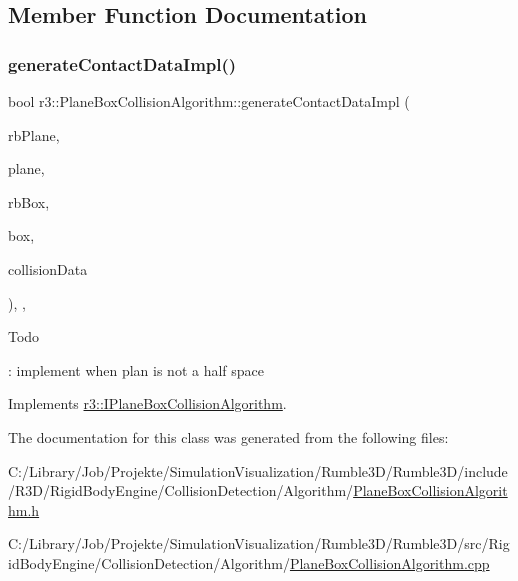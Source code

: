 \subsection{Member Function Documentation}
\mbox{\label{classr3_1_1_plane_box_collision_algorithm_a529c85973e9dab38e7427cdf9177d9ba}} 
\subsubsection{\texorpdfstring{generate\+Contact\+Data\+Impl()}{generateContactDataImpl()}}
{\footnotesize\ttfamily bool r3\+::\+Plane\+Box\+Collision\+Algorithm\+::generate\+Contact\+Data\+Impl (\begin{DoxyParamCaption}\item[{\mbox{\hyperlink{classr3_1_1_rigid_body}{Rigid\+Body}} $\ast$}]{rb\+Plane,  }\item[{\mbox{\hyperlink{classr3_1_1_collision_plane}{Collision\+Plane}} $\ast$}]{plane,  }\item[{\mbox{\hyperlink{classr3_1_1_rigid_body}{Rigid\+Body}} $\ast$}]{rb\+Box,  }\item[{\mbox{\hyperlink{classr3_1_1_collision_box}{Collision\+Box}} $\ast$}]{box,  }\item[{\mbox{\hyperlink{classr3_1_1_collision_data}{Collision\+Data}} \&}]{collision\+Data }\end{DoxyParamCaption})\hspace{0.3cm}{\ttfamily [override]}, {\ttfamily [protected]}, {\ttfamily [virtual]}}

\begin{DoxyRefDesc}{Todo}
\item[\mbox{\hyperlink{todo__todo000015}{Todo}}]\+: implement when plan is not a half space \end{DoxyRefDesc}


Implements \mbox{\hyperlink{classr3_1_1_i_plane_box_collision_algorithm_a48f6ca7613a0cc7c64d8e0cfe34674e8}{r3\+::\+I\+Plane\+Box\+Collision\+Algorithm}}.



The documentation for this class was generated from the following files\+:\begin{DoxyCompactItemize}
\item 
C\+:/\+Library/\+Job/\+Projekte/\+Simulation\+Visualization/\+Rumble3\+D/\+Rumble3\+D/include/\+R3\+D/\+Rigid\+Body\+Engine/\+Collision\+Detection/\+Algorithm/\mbox{\hyperlink{_plane_box_collision_algorithm_8h}{Plane\+Box\+Collision\+Algorithm.\+h}}\item 
C\+:/\+Library/\+Job/\+Projekte/\+Simulation\+Visualization/\+Rumble3\+D/\+Rumble3\+D/src/\+Rigid\+Body\+Engine/\+Collision\+Detection/\+Algorithm/\mbox{\hyperlink{_plane_box_collision_algorithm_8cpp}{Plane\+Box\+Collision\+Algorithm.\+cpp}}\end{DoxyCompactItemize}
